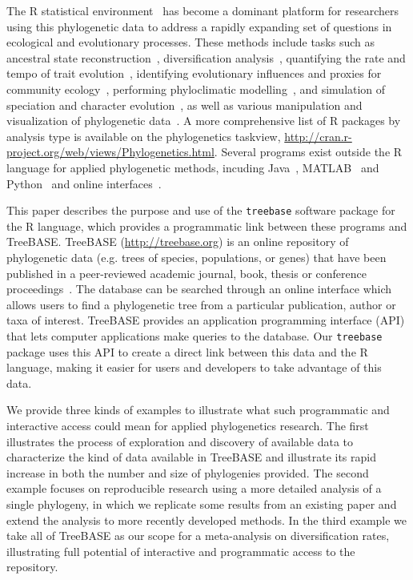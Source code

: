 \documentclass[authoryear, preprint]{elsarticle}
\begin{document}
The R statistical environment~\citep{RTeam2012} has become a dominant platform for researchers using this phylogenetic data 
to address a rapidly expanding set of questions in ecological and evolutionary processes.
These methods include tasks such as ancestral state reconstruction~\citep{Paradis2004, Butler2004}, 
diversification analysis~\citep{Paradis2004, Rabosky2006b, Harmon2008, FitzJohn2009, FitzJohn2010, Goldberg2011, Stadler2011}, 
quantifying the rate and tempo of trait evolution~\citep{Butler2004, Paradis2004, Harmon2008, Hipp2010, Revell2011, Eastman2011}, 
identifying evolutionary influences and proxies for community ecology~\citet{Webb2008, Kembel2010}, 
performing phyloclimatic modelling~\citep{Warren2008, Evans2009b}, 
and simulation of speciation and character evolution~\citep{Harmon2008, Stadler2011a, Boettiger2012}, 
as well as various manipulation and visualization of phylogenetic data~\citet{Paradis2004, Schliep2010, Jombart2010, Revell2011}. 
A more comprehensive list of R packages by analysis type is available on the phylogenetics taskview, \href{http://cran.r-project.org/web/views/Phylogenetics.html}{http://cran.r-project.org/web/views/Phylogenetics.html}.  
Several programs exist outside the R language for applied phylogenetic methods, incuding 
Java~\citep{Maddison2011}, MATLAB~\citep{Blomberg2003} and Python~\citep{Sukumaran2010} and online interfaces~\citep{Martins2004}.  


This paper describes the purpose and use of the \texttt{treebase} software package for the R language,
which provides a programmatic link between these programs and TreeBASE.
TreeBASE (\href{http://treebase.org}{http://treebase.org})
is an online repository of phylogenetic data (e.g. trees of species, populations, or genes) 
that have been published in a peer-reviewed academic journal, book, thesis or conference proceedings~\citep{Sanderson1994b, Morell1996}. 
The database can be searched through an online interface which 
allows users to find a phylogenetic tree from a particular publication, author or taxa of interest.  
TreeBASE provides an application programming interface (API) 
that lets computer applications make queries to the database.  
Our \texttt{treebase} package uses this API to create a direct link between this data and the R language, 
making it easier for users and developers to take advantage of this data.  

We provide three kinds of examples to illustrate what such programmatic and
interactive access could mean for applied phylogenetics research. 
The first illustrates the process of exploration and discovery of available data
to characterize the kind of data available in TreeBASE and illustrate its rapid increase
in both the number and size of phylogenies provided.  The second example focuses on 
reproducible research using a more detailed analysis of a single phylogeny, 
in which we replicate some results from an existing paper and extend the analysis
to more recently developed methods.  In the third example we take all of TreeBASE
as our scope for a meta-analysis on diversification rates, illustrating full potential
of interactive and programmatic access to the repository. 
\end{document}
